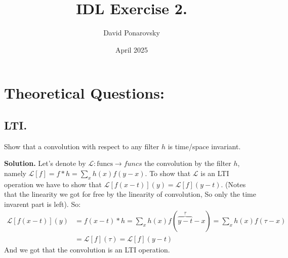 \documentclass{article}
\title{IDL Exercise 2.}
\author{David Ponarovsky}
\date{April 2025}
\begin{document}
\maketitle

\section{Theoretical Questions:}

\subsection{LTI.} Show that a convolution with respect to any filter $h$ is time/space invariant.


\textbf{Solution.} Let's denote by $\mathcal{L} : \text{funcs} \rightarrow {funcs}$ the convolution by the filter $h$, namely $\mathcal{L}[f] = f*h = \sum_{x}{h(x)f(y-x)}$. To show that $\mathcal{L}$ is an LTI operation we have to show that $\mathcal{L}[f(x-t)](y) = \mathcal{L}[f](y-t)$. (Notes that the linearity we got for free by the linearity of convolution, So only the time invarent part is left). So: 
\begin{equation*}
    \begin{split}
      \mathcal{L}[f(x-t)](y) &=  f(x-t)*h = \sum_{x}{h(x)f( \overbrace{y-t}^{\tau}-x)} = \sum_{x}{h(x)f(\tau-x)}\\
      &= \mathcal{L}[f](\tau) = \mathcal{L}[f](y-t)
    \end{split}
\end{equation*}
And we got that the convolution is an LTI operation.
 
\end{document}
